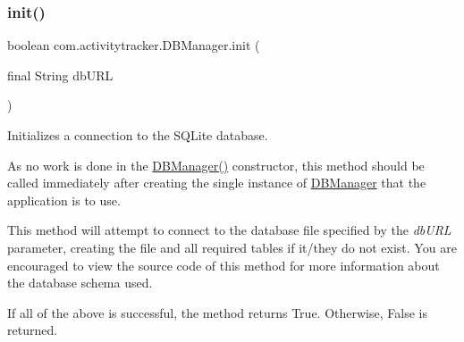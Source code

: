 \begin{DoxyCode}{0}

\end{DoxyCode}
\mbox{\label{classcom_1_1activitytracker_1_1_d_b_manager_a41df4600bb5901a26a4ea6a7108a70b9}} 
\subsubsection{\texorpdfstring{init()}{init()}}
{\footnotesize\ttfamily boolean com.\+activitytracker.\+D\+B\+Manager.\+init (\begin{DoxyParamCaption}\item[{final String}]{db\+U\+RL }\end{DoxyParamCaption})\hspace{0.3cm}{\ttfamily [package]}}

Initializes a connection to the S\+Q\+Lite database.

As no work is done in the \mbox{\hyperlink{classcom_1_1activitytracker_1_1_d_b_manager_ac1f558ef56fe02d74fe103a473a15bb5}{D\+B\+Manager()}} constructor, this method should be called immediately after creating the single instance of \mbox{\hyperlink{classcom_1_1activitytracker_1_1_d_b_manager}{D\+B\+Manager}} that the application is to use.

This method will attempt to connect to the database file specified by the {\itshape db\+U\+RL} parameter, creating the file and all required tables if it/they do not exist. You are encouraged to view the source code of this method for more information about the database schema used.

If all of the above is successful, the method returns True. Otherwise, False is returned.


